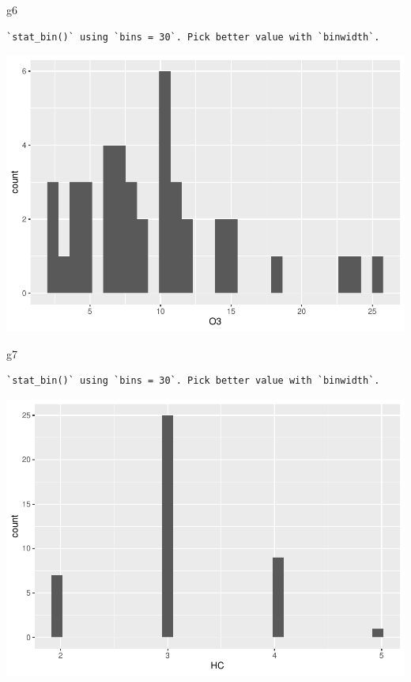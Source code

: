 \documentclass[
]{article}
\newenvironment{Shaded}{\begin{snugshade}}{\end{snugshade}}
\newcommand{\NormalTok}[1]{#1}
\begin{document}
\begin{Shaded}
\begin{Highlighting}[]
\NormalTok{g6}
\end{Highlighting}
\end{Shaded}

\begin{verbatim}
`stat_bin()` using `bins = 30`. Pick better value with `binwidth`.
\end{verbatim}

\includegraphics{Tarea1_files/figure-latex/unnamed-chunk-9-7.pdf}

\begin{Shaded}
\begin{Highlighting}[]
\NormalTok{g7}
\end{Highlighting}
\end{Shaded}

\begin{verbatim}
`stat_bin()` using `bins = 30`. Pick better value with `binwidth`.
\end{verbatim}

\includegraphics{Tarea1_files/figure-latex/unnamed-chunk-9-8.pdf}
\end{document}
